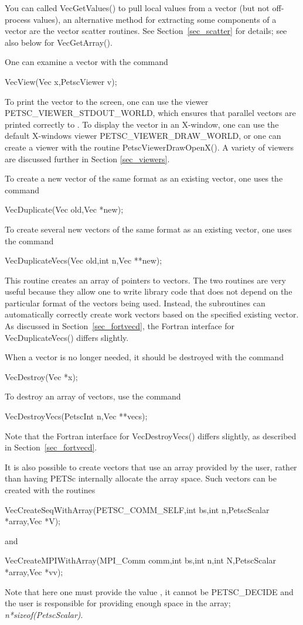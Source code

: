 You can called VecGetValues() to pull local values from a vector (but
not off-process values),
an alternative method for extracting some components of a vector are
the vector scatter routines.  See Section~\ref{sec_scatter} for details; see also
below for VecGetArray().

One can examine a vector with the command
\begin{tabbing}
  VecView(Vec x,PetscViewer v);
\end{tabbing}
To print the vector to the screen, one can use the viewer
PETSC\_VIEWER\_STDOUT\_WORLD,
which ensures that parallel vectors are printed correctly to
. To display the vector in an X-window, one can use the
default X-windows viewer PETSC\_VIEWER\_DRAW\_WORLD,
or one can create a viewer with the
routine PetscViewerDrawOpenX().  A variety of viewers are discussed
further in Section \ref{sec_viewers}.

To create a new vector of the same format as an existing vector, one uses
the command
\begin{tabbing}
  VecDuplicate(Vec old,Vec *new);
\end{tabbing}
To create several new vectors of the same format as an existing vector,
one uses the command
\begin{tabbing}
  VecDuplicateVecs(Vec old,int n,Vec **new);
\end{tabbing}
This routine creates an array of pointers to vectors. The two routines
are very useful because they allow one to write library code that does
not depend on the particular format of the vectors being used. Instead,
the subroutines can automatically correctly create work vectors
based on the specified existing vector.  As discussed in
Section~\ref{sec_fortvecd}, the Fortran interface for VecDuplicateVecs()
differs slightly.

When a vector is no longer needed, it should be destroyed with the
command
\begin{tabbing}
  VecDestroy(Vec *x);
\end{tabbing}
To destroy an array of vectors, use the command
\begin{tabbing}
  VecDestroyVecs(PetscInt n,Vec **vecs);
\end{tabbing}
Note that the Fortran interface for VecDestroyVecs() differs slightly,
as described in Section~\ref{sec_fortvecd}.

It is also possible to create vectors that use an array provided by the user,
rather than having PETSc internally allocate the array space.
Such vectors can be created with the routines
\begin{tabbing}
  VecCreateSeqWithArray(PETSC\_COMM\_SELF,int bs,int n,PetscScalar *array,Vec *V);
\end{tabbing}
and
\begin{tabbing}
  VecCreateMPIWithArray(MPI\_Comm comm,int bs,int n,int N,PetscScalar *array,Vec *vv);
\end{tabbing}
Note that here one must provide the value , it cannot be PETSC\_DECIDE and
the user is responsible for providing enough space in the array; {\em n*sizeof(PetscScalar)}.


